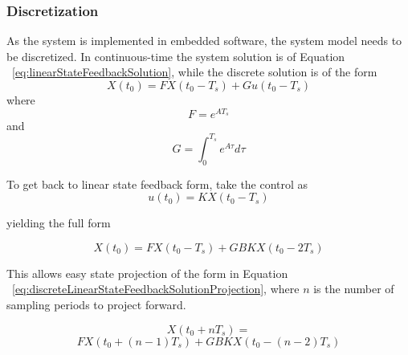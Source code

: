 \documentclass[conference]{IEEEtran}
\begin{document}
\subsubsection{Discretization}

As the system is implemented in embedded software, the system model needs to be discretized.  In continuous-time the system solution is of Equation ~\ref{eq:linearStateFeedbackSolution}, while the discrete solution is of the form 
\begin{equation}
X\left(t_0\right)=FX\left(t_0-T_s\right)+Gu\left(t_0-T_s\right)
\label{eq:discreteSolution}
\end{equation}
where
\begin{equation}
F=e^{AT_s}
\label{eq:discreteLinearStateFeedbackSolutionF}
\end{equation}
and
\begin{equation}
G=\int^{T_s}_0 e^{A\tau}d\tau
\label{discreteLinearStateFeedbackSolutionG}
\end{equation}

To get back to linear state feedback form, take the control as 
\begin{equation}
u\left(t_0\right)=KX\left(t_0-T_s\right)
\label{discreteLinearStateFeedbackSolutionu}
\end{equation}

yielding the full form

\begin{equation}
X\left(t_0\right)=FX\left(t_0-T_s\right)+GBKX\left(t_0-2T_s\right)
\label{eq:discreteLinearStateFeedbackSolution}
\end{equation}

This allows easy state projection of the form in Equation ~\ref{eq:discreteLinearStateFeedbackSolutionProjection}, where $n$ is the number of sampling periods to project forward.

\begin{equation}
  X\left(t_0+nT_s\right)=
	\label{eq:discreteLinearStateFeedbackSolutionProjection}
\end{equation}
\begin{equation*}
  FX\left(t_0+\left(n-1\right)T_s\right)+GBKX\left(t_0-\left(n-2\right)T_s\right) 
\end{equation*}

\end{document}
